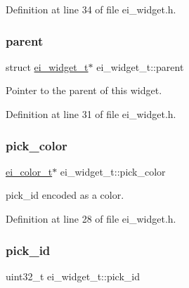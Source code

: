 Definition at line 34 of file ei\+\_\+widget.\+h.

\mbox{\label{structei__widget__t_adb1b43eda89c8e86d6337c939f1a4473}} 
\subsubsection{\texorpdfstring{parent}{parent}}
{\footnotesize\ttfamily struct \hyperlink{structei__widget__t}{ei\+\_\+widget\+\_\+t}$\ast$ ei\+\_\+widget\+\_\+t\+::parent}



Pointer to the parent of this widget. 



Definition at line 31 of file ei\+\_\+widget.\+h.

\mbox{\label{structei__widget__t_ad1477adf8e6b5cb6a5f11f657fe4781b}} 
\subsubsection{\texorpdfstring{pick\+\_\+color}{pick\_color}}
{\footnotesize\ttfamily \hyperlink{structei__color__t}{ei\+\_\+color\+\_\+t}$\ast$ ei\+\_\+widget\+\_\+t\+::pick\+\_\+color}



pick\+\_\+id encoded as a color. 



Definition at line 28 of file ei\+\_\+widget.\+h.

\mbox{\label{structei__widget__t_ada7ce878377d653d930a57e175b61182}} 
\subsubsection{\texorpdfstring{pick\+\_\+id}{pick\_id}}
{\footnotesize\ttfamily uint32\+\_\+t ei\+\_\+widget\+\_\+t\+::pick\+\_\+id}



